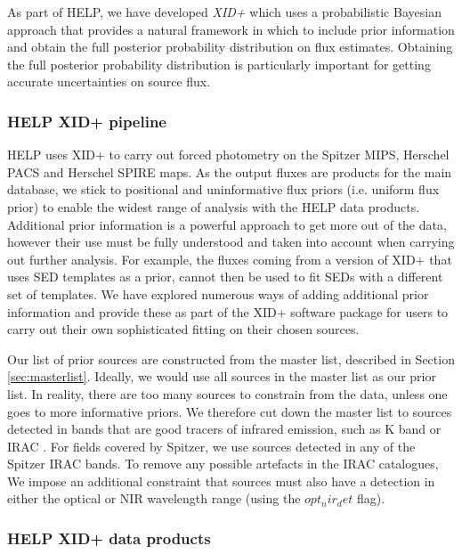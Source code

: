 \documentclass[usenatbib]{mnras}
\begin{document}
As part of HELP, we have developed \emph{XID+} \citep{Hurley:2017} which uses a probabilistic Bayesian approach that provides a natural framework in which to include prior information and obtain the full posterior probability distribution on flux estimates. Obtaining the full posterior probability distribution is particularly important for getting accurate uncertainties on source flux.

\subsubsection[HELP XID+ pipeline \\ {\color{red}Discusses how this was applied for different bands and prior lists}  ]{HELP XID+ pipeline}
HELP uses XID+ to carry out forced photometry on the Spitzer MIPS, Herschel PACS and Herschel SPIRE maps. As the output fluxes are products for the main database, we stick to positional and uninformative flux priors (i.e. uniform flux prior) to enable the widest range of analysis with the HELP data products. Additional prior information is a powerful approach to get more out of the data, however their use must be fully understood and taken into account when carrying out further analysis. For example, the fluxes coming from a version of XID+ that uses SED templates as a prior, cannot then be used to fit SEDs with a different set of templates. We have explored numerous ways of adding additional prior information and provide these as part of the XID+ software package for users to carry out their own sophisticated fitting on their chosen sources. 

Our list of prior sources are constructed from the master list, described in Section \ref{sec:masterlist}. Ideally, we would use all sources in the master list as our prior list. In reality, there are too many sources to constrain from the data, unless one goes to more informative priors. We therefore cut down the master list to sources detected in bands that are good tracers of infrared emission, such as K band or IRAC \citep{Duivenvorden:2018}. For fields covered by Spitzer, we use sources detected in any of the Spitzer IRAC bands. To remove any possible artefacts in the IRAC catalogues, We impose an additional constraint that sources must also have a detection in either the optical or NIR wavelength range (using the $opt_nir_det$ flag). 


\subsubsection{HELP XID+ data products}
\end{document}
